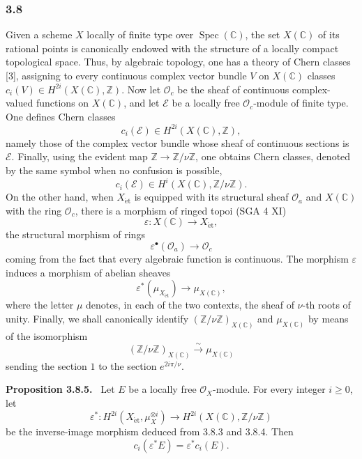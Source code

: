 \documentclass[11pt]{article}
\newenvironment{statement}[1]{\par\medskip\noindent\textbf{#1.}\ }{\par\medskip}
\providecommand{\et}{\mathrm{\acute{e}t}}
\providecommand{\et}{\acute{e}t}
\begin{document}
\subsubsection*{3.8}
Given a scheme $X$ locally of finite type over $\operatorname{Spec}(\mathbb C)$, the set $X(\mathbb C)$ of its rational points is canonically endowed with the structure of a locally compact topological space. Thus, by algebraic topology, one has a theory of Chern classes [3], assigning to every continuous complex vector bundle $V$ on $X(\mathbb C)$ classes $c_i(V)\in H^{2i}(X(\mathbb C),\mathbb Z)$. Now let $\mathcal O_c$ be the sheaf of continuous complex-valued functions on $X(\mathbb C)$, and let $\mathcal E$ be a locally free $\mathcal O_c$-module of finite type. One defines Chern classes
\[
c_i(\mathcal E)\in H^{2i}(X(\mathbb C),\mathbb Z),
\]
namely those of the complex vector bundle whose sheaf of continuous sections is $\mathcal E$. Finally, using the evident map $\mathbb Z\to\mathbb Z/\nu\mathbb Z$, one obtains Chern classes, denoted by the same symbol when no confusion is possible,
\[
c_i(\mathcal E)\in H^{i}(X(\mathbb C),\mathbb Z/\nu\mathbb Z).
\tag{3.8.1}
\]
On the other hand, when $X_{\et}$ is equipped with its structural sheaf $\mathcal O_a$ and $X(\mathbb C)$ with the ring $\mathcal O_c$, there is a morphism of ringed topoi (SGA 4 XI)
\[
\varepsilon:X(\mathbb C)\to X_{\et},
\]
the structural morphism of rings
\[
\varepsilon^\bullet(\mathcal O_a)\to\mathcal O_c
\tag{3.8.2}
\]
coming from the fact that every algebraic function is continuous. The morphism $\varepsilon$ induces a morphism of abelian sheaves
\[
\varepsilon^*(\mu_{X_{\et}})\to \mu_{X(\mathbb C)},
\tag{3.8.3}
\]
where the letter $\mu$ denotes, in each of the two contexts, the sheaf of $\nu$-th roots of unity. Finally, we shall canonically identify $(\mathbb Z/\nu\mathbb Z)_{X(\mathbb C)}$ and $\mu_{X(\mathbb C)}$ by means of the isomorphism
\[
(\mathbb Z/\nu\mathbb Z)_{X(\mathbb C)}
 \xrightarrow{\sim}\mu_{X(\mathbb C)}
\tag{3.8.4}
\]
sending the section $1$ to the section $e^{2i\pi/\nu}$.

\begin{statement}{Proposition 3.8.5}
Let $E$ be a locally free $\mathcal O_X$-module. For every integer $i\ge0$, let
\[
\varepsilon^*:H^{2i}(X_{\et},\mu_X^{\otimes i})
\to H^{2i}(X(\mathbb C),\mathbb Z/\nu\mathbb Z)
\]
be the inverse-image morphism deduced from 3.8.3 and 3.8.4. Then
\[
c_i(\varepsilon^*E)=\varepsilon^*c_i(E).
\]
\end{statement}
\end{document}

